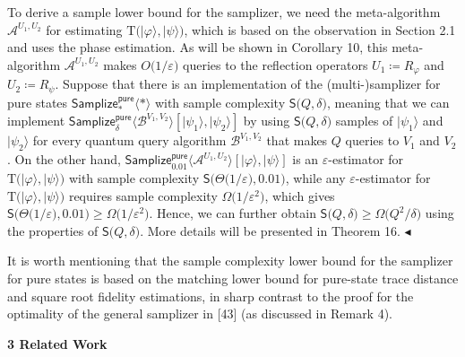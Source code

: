 \documentclass[10pt,a4paper]{article}
\begin{document}
To derive a sample lower bound for the samplizer, we need the meta-algorithm $\mathcal{A}^{U_{1},U_{2}}$ for estimating $\mathrm{T}\lparen\lvert\varphi\rangle,\lvert\psi\rangle\rparen$, which is based on the observation in Section 2.1 and uses the phase estimation. As will be shown in Corollary 10,
this meta-algorithm $\mathcal{A}^{U_{1},U_{2}}$ makes $O\lparen 1/\varepsilon\rparen$ queries to the reflection operators $U_{1}\coloneqq R_{\varphi}$ and $U_{2}\coloneqq R_{\psi}$.
Suppose that there is an implementation of the (multi-)samplizer for pure states $\mathsf{Samplize}^{\mathsf{pure}}_{*}\langle*\rangle$ with sample complexity $\mathsf{S}\lparen Q,\delta\rparen$, meaning that we can implement $\mathsf{Samplize}^{\mathsf{pure}}_{\delta}\langle\mathcal{B}^{V_{1},V_{2}}\rangle[\lvert\psi_{1}\rangle,\lvert\psi_{2}\rangle]$ by using $\mathsf{S}\lparen Q,\delta\rparen$ samples of $\lvert\psi_{1}\rangle$ and $\lvert\psi_{2}\rangle$ for every quantum query algorithm $\mathcal{B}^{V_{1},V_{2}}$ that makes $Q$ queries to $V_{1}$ and $V_{2}$.
On the other hand, $\mathsf{Samplize}^{\mathsf{pure}}_{0.01}\langle\mathcal{A}^{U_{1},U_{2}}\rangle[\lvert\varphi\rangle,\lvert\psi\rangle]$ is an $\varepsilon$-estimator for $\mathrm{T}\lparen\lvert\varphi\rangle,\lvert\psi\rangle\rparen$ with sample complexity $\mathsf{S}\lparen\Theta\lparen 1/\varepsilon\rparen,0.01\rparen$, while any $\varepsilon$-estimator for $\mathrm{T}\lparen\lvert\varphi\rangle,\lvert\psi\rangle\rparen$ requires sample complexity $\Omega\lparen 1/\varepsilon^{2}\rparen$, which gives $\mathsf{S}\lparen\Theta\lparen 1/\varepsilon\rparen,0.01\rparen\geq\Omega\lparen 1/\varepsilon^{2}\rparen$.
Hence, we can further obtain $\mathsf{S}\lparen Q,\delta\rparen\geq\Omega\lparen Q^{2}/\delta\rparen$ using the properties of $\mathsf{S}\lparen Q,\delta\rparen$.
More details will be presented in Theorem 16.
$\blacktriangleleft$\par




It is worth mentioning that the sample complexity lower bound for the samplizer for pure states is based on the matching lower bound for pure-state trace distance and square root fidelity estimations, in sharp contrast to the proof for the optimality of the general samplizer in [43] (as discussed in Remark 4).\par







\par\medskip\noindent\textbf{
3 Related Work}\par
\end{document}
